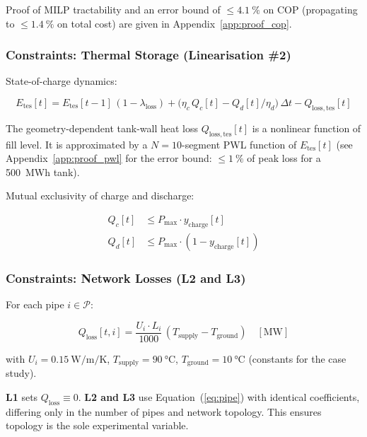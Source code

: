 \documentclass[a4paper,fleqn]{cas-sc}
\newcommand{\Qloss}{Q_{\mathrm{loss}}}
\newcommand{\Etes}{E_{\mathrm{tes}}}
\begin{document}
Proof of MILP tractability and an error bound of $\leq \SI{4.1}{\percent}$
on COP (propagating to $\leq \SI{1.4}{\percent}$ on total cost) are given
in Appendix~\ref{app:proof_cop}.

\subsubsection{Constraints: Thermal Storage (Linearisation \#2)}

State-of-charge dynamics:

\begin{equation}
  \Etes[t] = \Etes[t-1]\,(1-\lambda_{\mathrm{loss}})
             + \bigl(\eta_c\,Q_c[t] - Q_d[t]/\eta_d\bigr)\,\Delta t
             - Q_{\mathrm{loss,tes}}[t] \tag{7} \label{eq:soc}
\end{equation}

The geometry-dependent tank-wall heat loss $Q_{\mathrm{loss,tes}}[t]$
is a nonlinear function of fill level.  It is approximated by a
$N=10$-segment PWL function of $\Etes[t]$ (see Appendix~\ref{app:proof_pwl}
for the error bound: $\leq \SI{1}{\percent}$ of peak loss for a
\SI{500}{MWh} tank).

Mutual exclusivity of charge and discharge:

\begin{align}
  Q_c[t] &\leq P_{\max} \cdot y_{\mathrm{charge}}[t] \tag{8}\\
  Q_d[t] &\leq P_{\max} \cdot (1 - y_{\mathrm{charge}}[t]) \tag{9}
\end{align}

\subsubsection{Constraints: Network Losses (L2 and L3)}
\label{sec:network_losses}

For each pipe $i \in \mathcal{P}$:

\begin{equation}
  \Qloss[t,i] = \frac{U_i \cdot L_i}{1000}\,(T_{\mathrm{supply}} - T_{\mathrm{ground}})
  \quad [\si{\mega\watt}] \tag{9} \label{eq:pipe}
\end{equation}

\noindent with $U_i = \SI{0.15}{\watt\per\metre\per\kelvin}$,
$T_{\mathrm{supply}} = \SI{90}{\degreeCelsius}$,
$T_{\mathrm{ground}} = \SI{10}{\degreeCelsius}$ (constants for the case study).

\textbf{L1} sets $\Qloss \equiv 0$.
\textbf{L2 and L3} use Equation~(\ref{eq:pipe}) with identical coefficients,
differing only in the number of pipes and network topology.
This ensures topology is the sole experimental variable.
\end{document}
